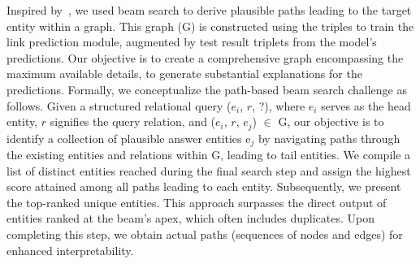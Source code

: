 \documentclass[letterpaper]{article} %
\begin{document}
Inspired by~\cite{10.1145/3514221.3517887}, we used beam search to derive plausible paths leading to the target entity within a graph. This graph (G) is constructed using the triples to train the link prediction module, augmented by test result triplets from the model's predictions. Our objective is to create a comprehensive graph encompassing the maximum available details, to generate substantial explanations for the predictions.
Formally, we conceptualize the path-based beam search challenge as follows. Given a structured relational query ($e_i$, $r$, ?), where $e_i$ serves as the head entity, $r$ signifies the query relation, and ($e_i$, $r$, $e_j$) $\in$ G, our objective is to identify a collection of plausible answer entities {e$_j$} by navigating paths through the existing entities and relations within G, leading to tail entities. We compile a list of distinct entities reached during the final search step and assign the highest score attained among all paths leading to each entity. Subsequently, we present the top-ranked unique entities. This approach surpasses the direct output of entities ranked at the beam's apex, which often includes duplicates. Upon completing this step, we obtain actual paths (sequences of nodes and edges) for enhanced interpretability.
\end{document}

